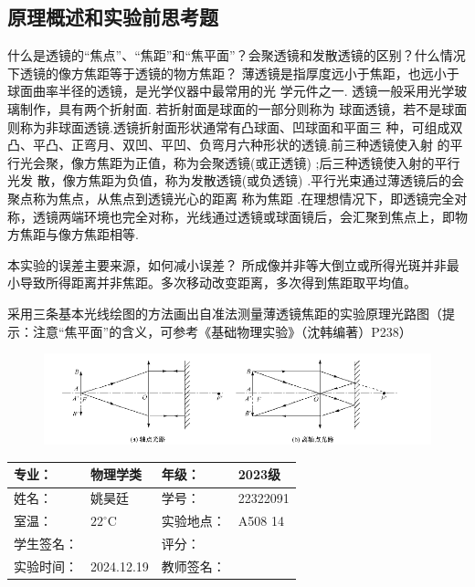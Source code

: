 \documentclass[dvipsnames, svgnames,a4paper,11pt]{article}
\begin{document}
\subsection{原理概述和实验前思考题}
\begin{question}
    什么是透镜的“焦点”、“焦距”和“焦平面”？会聚透镜和发散透镜的区别？什么情况下透镜的像方焦距等于透镜的物方焦距？
    \tcblower
    薄透镜是指厚度远小于焦距，也远小于球面曲率半径的透镜，是光学仪器中最常用的光
学元件之一. 透镜一般采用光学玻璃制作，具有两个折射面. 若折射面是球面的一部分则称为
球面透镜，若不是球面则称为非球面透镜.透镜折射面形状通常有凸球面、凹球面和平面三
种，可组成双凸、平凸、正弯月、双凹、平凹、负弯月六种形状的透镜.前三种透镜使入射
的平行光会聚，像方焦距为正值，称为会聚透镜(或正透镜) ;后三种透镜使入射的平行光发
散，像方焦距为负值，称为发散透镜(或负透镜) .平行光束通过薄透镜后的会聚点称为焦点，从焦点到透镜光心的距离
称为焦距 .在理想情况下，即透镜完全对称，透镜两端环境也完全对称，光线通过透镜或球面镜后，会汇聚到焦点上，即物方焦距与像方焦距相等.
\end{question}

\begin{question}
    本实验的误差主要来源，如何减小误差？
    \tcblower
    所成像并非等大倒立或所得光斑并非最小导致所得距离并非焦距。多次移动改变距离，多次得到焦距取平均值。
\end{question}

\begin{question}
    采用三条基本光线绘图的方法画出自准法测量薄透镜焦距的实验原理光路图（提示：注意“焦平面”的含义，可参考《基础物理实验》（沈韩编著）P238）
    \tcblower
    \begin{figure}[H]
        \includegraphics[width=\textwidth]{透镜焦距光路图.png}
    \end{figure}
\end{question}

\clearpage
{}
\begin{table}
	\renewcommand\arraystretch{1.7}
	\centering
	\begin{tabularx}{\textwidth}{|X|X|X|X|}
	\hline
	专业：& 物理学类 &年级：& 2023级 \\
	\hline
	姓名： &姚昊廷& 学号：&22322091  \\
	\hline
	室温：&$22^\circ$C&实验地点：&A508  14\\
	\hline
	学生签名：& & 评分： &\\
	\hline
	实验时间：& 2024.12.19& 教师签名：&\\
	\hline
	\end{tabularx}
\end{table}
\end{document}
